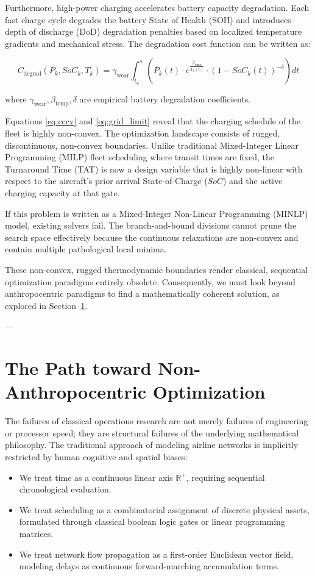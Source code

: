 \documentclass[11pt,a4paper]{book}
\begin{document}
Furthermore, high-power charging accelerates battery capacity degradation. Each fast charge cycle degrades the battery State of Health (SOH) and introduces depth of discharge (DoD) degradation penalties based on localized temperature gradients and mechanical stress. The degradation cost function can be written as:

\begin{equation}
C_{\text{degrad}}\left(P_k, SoC_k, T_k\right) = \gamma_{\text{wear}} \int_{t_0}^{s} \left( P_k(t) \cdot e^{\frac{\beta_{\text{temp}}}{T_k(t)}} \cdot \left(1 - SoC_k(t)\right)^{-\delta} \right) dt
\end{equation}

where $\gamma_{\text{wear}}, \beta_{\text{temp}}, \delta$ are empirical battery degradation coefficients.

Equations \ref{eq:cccv} and \ref{eq:grid_limit} reveal that the charging schedule of the fleet is highly non-convex. The optimization landscape consists of rugged, discontinuous, non-convex boundaries. Unlike traditional Mixed-Integer Linear Programming (MILP) fleet scheduling where transit times are fixed, the Turnaround Time (TAT) is now a design variable that is highly non-linear with respect to the aircraft's prior arrival State-of-Charge ($SoC$) and the active charging capacity at that gate. 

If this problem is written as a Mixed-Integer Non-Linear Programming (MINLP) model, existing solvers fail. The branch-and-bound divisions cannot prune the search space effectively because the continuous relaxations are non-convex and contain multiple pathological local minima.

These non-convex, rugged thermodynamic boundaries render classical, sequential optimization paradigms entirely obsolete. Consequently, we must look beyond anthropocentric paradigms to find a mathematically coherent solution, as explored in Section~\ref{sec:path_optimization}.

---

\section{The Path toward Non-Anthropocentric Optimization}\label{sec:path_optimization}

The failures of classical operations research are not merely failures of engineering or processor speed; they are structural failures of the underlying mathematical philosophy. The traditional approach of modeling airline networks is implicitly restricted by human cognitive and spatial biases:
\begin{itemize}
    \item We treat time as a continuous linear axis $\mathbb{R}^+$, requiring sequential chronological evaluation.
    \item We treat scheduling as a combinatorial assignment of discrete physical assets, formulated through classical boolean logic gates or linear programming matrices.
    \item We treat network flow propagation as a first-order Euclidean vector field, modeling delays as continuous forward-marching accumulation terms.
\end{itemize}
\end{document}
